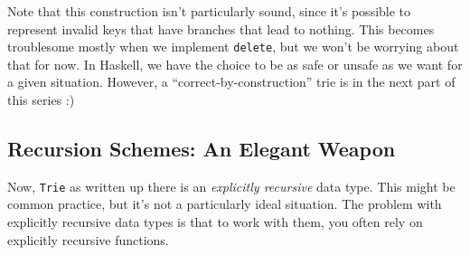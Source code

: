 \documentclass[]{article}
\newenvironment{Shaded}{}{}
\newcommand{\CharTok}[1]{\textcolor[rgb]{0.25,0.44,0.63}{#1}}
\newcommand{\CommentTok}[1]{\textcolor[rgb]{0.38,0.63,0.69}{\textit{#1}}}
\newcommand{\DataTypeTok}[1]{\textcolor[rgb]{0.56,0.13,0.00}{#1}}
\newcommand{\DecValTok}[1]{\textcolor[rgb]{0.25,0.63,0.44}{#1}}
\newcommand{\NormalTok}[1]{#1}
\newcommand{\OperatorTok}[1]{\textcolor[rgb]{0.40,0.40,0.40}{#1}}
\newcommand{\OtherTok}[1]{\textcolor[rgb]{0.00,0.44,0.13}{#1}}
\begin{document}
\begin{Shaded}
\end{Shaded}

Note that this construction isn't particularly sound, since it's possible to
represent invalid keys that have branches that lead to nothing. This becomes
troublesome mostly when we implement \texttt{delete}, but we won't be worrying
about that for now. In Haskell, we have the choice to be as safe or unsafe as we
want for a given situation. However, a ``correct-by-construction'' trie is in
the next part of this series :)

\subsection{Recursion Schemes: An Elegant
Weapon}\label{recursion-schemes-an-elegant-weapon}

Now, \texttt{Trie} as written up there is an \emph{explicitly recursive} data
type. This might be common practice, but it's not a particularly ideal
situation. The problem with explicitly recursive data types is that to work with
them, you often rely on explicitly recursive functions.
\end{document}
